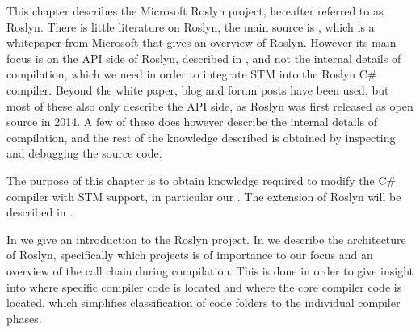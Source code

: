 \makeatletter {}\makeatother
{}


This chapter describes the Microsoft Roslyn project, hereafter referred to as Roslyn. There is little literature on Roslyn, the main source is , which is a whitepaper from Microsoft that gives an overview of Roslyn. However its main focus is on the API side of Roslyn, described in , and not the internal details of compilation, which we need in order to integrate \ac{STM} into the Roslyn C\# compiler. Beyond the white paper, blog and forum posts have been used, but most of these also only describe the API side, as Roslyn was first released as open source in 2014\cite{csharpBuild}. A few of these does however describe the internal details of compilation, and the rest of the knowledge described is obtained by inspecting and debugging the source code.

The purpose of this chapter is to obtain knowledge required to modify the C\# compiler with \ac{STM} support, in particular our \stmname. The extension of Roslyn will be described in .


In  we give an introduction to the Roslyn project. In  we describe the architecture of Roslyn, specifically which projects is of importance to our focus and an overview of the call chain during compilation. This is done in order to give insight into where specific compiler code is located and where the core compiler code is located, which simplifies classification of code folders to the individual compiler phases. %

